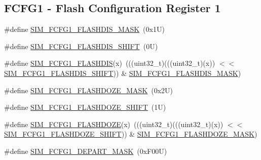\subsection*{F\+C\+F\+G1 -\/ Flash Configuration Register 1}
\begin{DoxyCompactItemize}
\item 
\#define \mbox{\hyperlink{group___s_i_m___register___masks_gad2bcfe2db5329ab186bb8393228f24cc}{S\+I\+M\+\_\+\+F\+C\+F\+G1\+\_\+\+F\+L\+A\+S\+H\+D\+I\+S\+\_\+\+M\+A\+SK}}~(0x1\+U)
\item 
\#define \mbox{\hyperlink{group___s_i_m___register___masks_ga1a8408a876a3a68b16780a1d45d539df}{S\+I\+M\+\_\+\+F\+C\+F\+G1\+\_\+\+F\+L\+A\+S\+H\+D\+I\+S\+\_\+\+S\+H\+I\+FT}}~(0\+U)
\item 
\#define \mbox{\hyperlink{group___s_i_m___register___masks_gaa783d3af583f1bcf4cd7805d8fcdf6e5}{S\+I\+M\+\_\+\+F\+C\+F\+G1\+\_\+\+F\+L\+A\+S\+H\+D\+IS}}(x)~(((uint32\+\_\+t)(((uint32\+\_\+t)(x)) $<$$<$ \mbox{\hyperlink{group___s_i_m___register___masks_ga1a8408a876a3a68b16780a1d45d539df}{S\+I\+M\+\_\+\+F\+C\+F\+G1\+\_\+\+F\+L\+A\+S\+H\+D\+I\+S\+\_\+\+S\+H\+I\+FT}})) \& \mbox{\hyperlink{group___s_i_m___register___masks_gad2bcfe2db5329ab186bb8393228f24cc}{S\+I\+M\+\_\+\+F\+C\+F\+G1\+\_\+\+F\+L\+A\+S\+H\+D\+I\+S\+\_\+\+M\+A\+SK}})
\item 
\#define \mbox{\hyperlink{group___s_i_m___register___masks_ga5922dc31ee4c05aba3cfeaa4474fddb8}{S\+I\+M\+\_\+\+F\+C\+F\+G1\+\_\+\+F\+L\+A\+S\+H\+D\+O\+Z\+E\+\_\+\+M\+A\+SK}}~(0x2\+U)
\item 
\#define \mbox{\hyperlink{group___s_i_m___register___masks_ga3f6c60d4baf2c592dbd5c43974bd19f3}{S\+I\+M\+\_\+\+F\+C\+F\+G1\+\_\+\+F\+L\+A\+S\+H\+D\+O\+Z\+E\+\_\+\+S\+H\+I\+FT}}~(1\+U)
\item 
\#define \mbox{\hyperlink{group___s_i_m___register___masks_gaa8869a17756fb7c7746ce191f97073ec}{S\+I\+M\+\_\+\+F\+C\+F\+G1\+\_\+\+F\+L\+A\+S\+H\+D\+O\+ZE}}(x)~(((uint32\+\_\+t)(((uint32\+\_\+t)(x)) $<$$<$ \mbox{\hyperlink{group___s_i_m___register___masks_ga3f6c60d4baf2c592dbd5c43974bd19f3}{S\+I\+M\+\_\+\+F\+C\+F\+G1\+\_\+\+F\+L\+A\+S\+H\+D\+O\+Z\+E\+\_\+\+S\+H\+I\+FT}})) \& \mbox{\hyperlink{group___s_i_m___register___masks_ga5922dc31ee4c05aba3cfeaa4474fddb8}{S\+I\+M\+\_\+\+F\+C\+F\+G1\+\_\+\+F\+L\+A\+S\+H\+D\+O\+Z\+E\+\_\+\+M\+A\+SK}})
\item 
\#define \mbox{\hyperlink{group___s_i_m___register___masks_ga7b4c8f63810498cd22002a2f3b1bdc0d}{S\+I\+M\+\_\+\+F\+C\+F\+G1\+\_\+\+D\+E\+P\+A\+R\+T\+\_\+\+M\+A\+SK}}~(0x\+F00\+U)
\item 

\end{DoxyCompactItemize}
